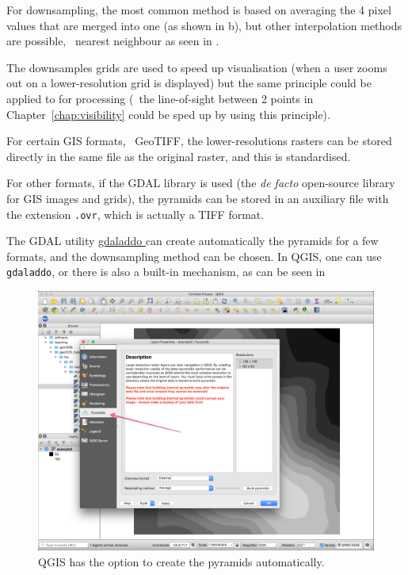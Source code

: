 %

For downsampling, the most common method is based on averaging the 4 pixel values that are merged into one (as shown in b), but other interpolation methods are possible, \eg\ nearest neighbour as seen in .

%

The downsamples grids are used to speed up visualisation (when a user zooms out on a lower-resolution grid is displayed) but the same principle could be applied to for processing (\eg\ the line-of-sight between 2 points in Chapter~\ref{chap:visibility} could be sped up by using this principle).


\begin{kaobox-practice}[frametitle=\faCog\ How does it work in practice?]
  For certain GIS formats, \eg\ GeoTIFF, the lower-resolutions rasters can be stored directly in the same file as the original raster, and this is standardised.

  For other formats, if the GDAL library is used (the \emph{de facto} open-source library for GIS images and grids), the pyramids can be stored in an auxiliary file with the extension \texttt{.ovr}, which is actually a TIFF format.

  The GDAL utility \href{https://www.gdal.org/gdaladdo.html}{gdaladdo \faExternalLink} can create automatically the pyramids for a few formats, and the downsampling method can be chosen.
  In QGIS, one can use \texttt{gdaladdo}, or there is also a built-in mechanism, as can be seen in 
\end{kaobox-practice}

\begin{figure}
  \centering
  \includegraphics[width=\linewidth]{figs/qgis}
  \caption{QGIS has the option to create the pyramids automatically.}%
%
\end{figure}



